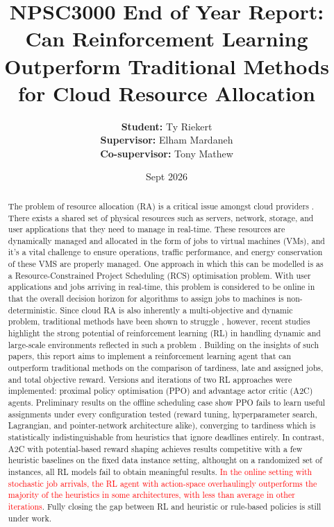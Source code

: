 \documentclass[12pt]{article}
\title{NPSC3000 End of Year Report: Can Reinforcement Learning Outperform Traditional Methods for Cloud Resource Allocation}
\author{
\textbf{Student:} Ty Riekert \\
\textbf{Supervisor:} Elham Mardaneh \\
\textbf{Co-supervisor:} Tony Mathew
}
\date{Sept 2026}
\begin{document}
\maketitle
\begin{abstract}
    The problem of resource allocation (RA) is a critical issue amongst cloud providers \cite{saidi2023, sdn2021, vinothina2012, parikh2013, mohamaddiah2014}. There exists a shared set of physical resources such as servers, network, storage, and user applications that they need to manage in real-time. These resources are dynamically managed and allocated in the form of jobs to virtual machines (VMs), and it's a vital challenge to ensure operations, traffic performance, and energy conservation of these VMS are properly managed. One approach in which this can be modelled is as a Resource-Constrained Project Scheduling (RCS) optimisation problem. With user applications and jobs arriving in real-time, this problem is considered to be online in that the overall decision horizon for algorithms to assign jobs to machines is non-deterministic. Since cloud RA is also inherently a multi-objective and dynamic problem, traditional methods have been shown to struggle \cite{lbts2024, 10854610, DAHMANI2025100616, DBLP:journals/corr/abs-2107-04333}, however, recent studies highlight the strong potential of reinforcement learning (RL) in handling dynamic and large-scale environments reflected in such a problem \cite{saidi2023, autoscaling2023, lbts2024, dynamic2026}. Building on the insights of such papers, this report aims to implement a reinforcement learning agent that can outperform traditional methods on the comparison of tardiness, late and assigned jobs, and total objective reward. Versions and iterations of two RL approaches were implemented: proximal policy optimisation (PPO) and advantage actor critic (A2C) agents. Preliminary results on the offline scheduling case show PPO fails to learn useful assignments under every configuration tested (reward tuning, hyperparameter search, Lagrangian, and pointer-network architecture alike), converging to tardiness which is statistically indistinguishable from heuristics that ignore deadlines entirely. In contrast, A2C with potential-based reward shaping \cite{ng1999shaping} achieves results competitive with a few heuristic baselines on the fixed data instance setting, althought on a randomized set of instances, all RL models fail to obtain meaningful results. \textcolor{red}{In the online setting with stochastic job arrivals, the RL agent with action-space overhaulingly outperforms the majority of the heuristics in some architectures, with less than average in other iterations}. Fully closing the gap between RL and heuristic or rule-based policies is still under work.

\end{abstract}
\end{document}
